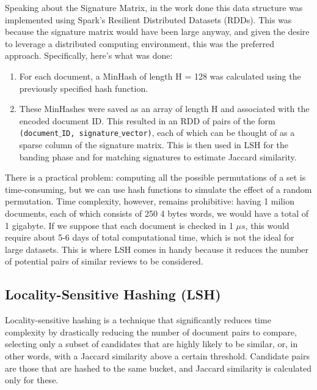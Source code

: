 \documentclass[12pt, a4paper]{article}
\begin{document}
Speaking about the Signature Matrix, in the work done this data structure was implemented using Spark's Resilient Distributed Datasets (RDDs). This was because the signature matrix would have been large anyway, and given the desire to leverage a distributed computing environment, this was the preferred approach. Specifically, here's what was done:
\begin{enumerate}
    \item For each document, a MinHash of length H = 128 was calculated using the previously specified hash function.
    \item These MinHashes were saved as an array of length H and associated with the encoded document ID. This resulted in an RDD of pairs of the form \texttt{(document$\_$ID, signature$\_$vector)}, each of which can be thought of as a sparse column of the signature matrix. This is then used in LSH for the banding phase and for matching signatures to estimate Jaccard similarity.
\end{enumerate}

There is a practical problem: computing all the possible permutations of a set is time-consuming, but we can use hash functions to simulate the effect of a random permutation. Time complexity, however, remains prohibitive: having 1 milion documents, each of which consists of 250 4 bytes words, we would have a total of 1 gigabyte. If we suppose that each document is checked in 1 $\mu s
$, this would require about 5-6 days of total computational time, which is not the ideal for large datasets. This is where LSH comes in handy because it reduces the number of potential pairs of similar reviews to be considered. 
\subsection{Locality-Sensitive Hashing (LSH)}
Locality-sensitive hashing is a technique that significantly reduces time complexity by drastically reducing the number of document pairs to compare, selecting only a subset of candidates that are highly likely to be similar, or, in other words, with a Jaccard similarity above a certain threshold. Candidate pairs are those that are hashed to the same bucket, and Jaccard similarity is calculated only for these.
\end{document}

